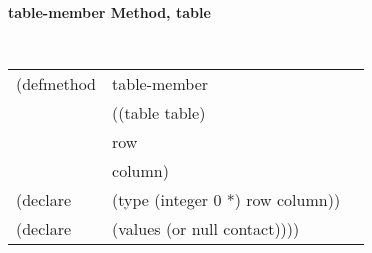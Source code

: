 	  
%
%
%
%
%
%
%

	  
{\samepage
{\large {\bf table-member \hfill Method, table}}
\begin{flushright} \parbox[t]{6.125in}{
\tt
\begin{tabular}{lll}
\raggedright
(defmethod & table-member & \\
& ((table  table)\\
& row \\
& column) \\
(declare &(type (integer 0 *)  row column))\\
(declare & (values (or null contact))))
\end{tabular}
\rm

}\end{flushright}}


